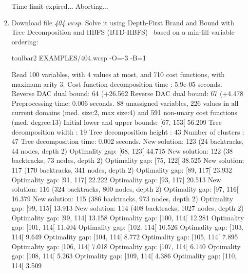 \begin{enumerate}
{\begin{DoxyCode}
Time limit expired... Aborting...
\end{DoxyCode}}
\item Download file {\em 404.wcsp}. Solve it using Depth-First Brand and Bound with Tree Decomposition and HBFS (BTD-HBFS)~\cite{Schiex06a} based on a min-fill variable ordering:
\begin{DoxyCode}
	toulbar2 EXAMPLES/404.wcsp -O=-3 -B=1
\end{DoxyCode}
{\scriptsize
\begin{DoxyCode}
Read 100 variables, with 4 values at most, and 710 cost functions, with maximum arity 3.
Cost function decomposition time : 5.9e-05 seconds.
Reverse DAC dual bound: 64 (+26.562%
Reverse DAC dual bound: 67 (+4.478%
Preprocessing time: 0.006 seconds.
88 unassigned variables, 226 values in all current domains (med. size:2, max size:4) and 591 non-unary cost functions (med. degree:13)
Initial lower and upper bounds: [67, 153[ 56.209%
Tree decomposition width  : 19
Tree decomposition height : 43
Number of clusters        : 47
Tree decomposition time: 0.002 seconds.
New solution: 123 (24 backtracks, 44 nodes, depth 2)
Optimality gap: [68, 123[ 44.715 %
New solution: 122 (38 backtracks, 73 nodes, depth 2)
Optimality gap: [75, 122[ 38.525 %
New solution: 117 (170 backtracks, 341 nodes, depth 2)
Optimality gap: [89, 117[ 23.932 %
Optimality gap: [91, 117[ 22.222 %
Optimality gap: [93, 117[ 20.513 %
New solution: 116 (324 backtracks, 800 nodes, depth 2)
Optimality gap: [97, 116[ 16.379 %
New solution: 115 (386 backtracks, 973 nodes, depth 2)
Optimality gap: [99, 115[ 13.913 %
New solution: 114 (408 backtracks, 1027 nodes, depth 2)
Optimality gap: [99, 114[ 13.158 %
Optimality gap: [100, 114[ 12.281 %
Optimality gap: [101, 114[ 11.404 %
Optimality gap: [102, 114[ 10.526 %
Optimality gap: [103, 114[ 9.649 %
Optimality gap: [104, 114[ 8.772 %
Optimality gap: [105, 114[ 7.895 %
Optimality gap: [106, 114[ 7.018 %
Optimality gap: [107, 114[ 6.140 %
Optimality gap: [108, 114[ 5.263 %
Optimality gap: [109, 114[ 4.386 %
Optimality gap: [110, 114[ 3.509 %

\end{DoxyCode}}
\end{enumerate}
